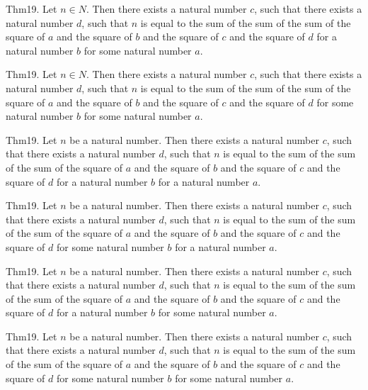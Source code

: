 \documentclass{article}
\begin{document}
Thm19. Let $n \in N$. Then there exists a natural number $c$, such that there exists a natural number $d$, such that $n$ is equal to the sum of the sum of the sum of the square of $a$ and the square of $b$ and the square of $c$ and the square of $d$ for a natural number $b$ for some natural number $a$.

Thm19. Let $n \in N$. Then there exists a natural number $c$, such that there exists a natural number $d$, such that $n$ is equal to the sum of the sum of the sum of the square of $a$ and the square of $b$ and the square of $c$ and the square of $d$ for some natural number $b$ for some natural number $a$.

Thm19. Let $n$ be a natural number. Then there exists a natural number $c$, such that there exists a natural number $d$, such that $n$ is equal to the sum of the sum of the sum of the square of $a$ and the square of $b$ and the square of $c$ and the square of $d$ for a natural number $b$ for a natural number $a$.

Thm19. Let $n$ be a natural number. Then there exists a natural number $c$, such that there exists a natural number $d$, such that $n$ is equal to the sum of the sum of the sum of the square of $a$ and the square of $b$ and the square of $c$ and the square of $d$ for some natural number $b$ for a natural number $a$.

Thm19. Let $n$ be a natural number. Then there exists a natural number $c$, such that there exists a natural number $d$, such that $n$ is equal to the sum of the sum of the sum of the square of $a$ and the square of $b$ and the square of $c$ and the square of $d$ for a natural number $b$ for some natural number $a$.

Thm19. Let $n$ be a natural number. Then there exists a natural number $c$, such that there exists a natural number $d$, such that $n$ is equal to the sum of the sum of the sum of the square of $a$ and the square of $b$ and the square of $c$ and the square of $d$ for some natural number $b$ for some natural number $a$.
\end{document}
